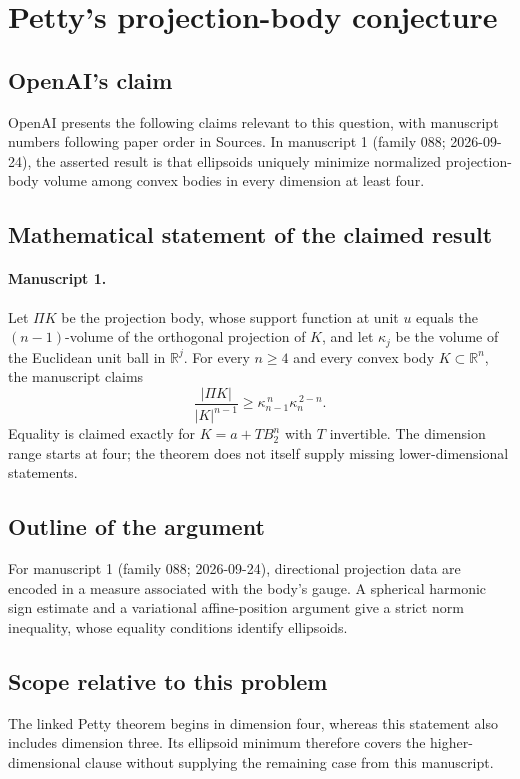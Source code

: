 \documentclass[11pt]{article}
\begin{document}
\section*{Petty's projection-body conjecture}

\subsection{OpenAI's claim}
OpenAI presents the following claims relevant to this question, with manuscript numbers following paper order in Sources. In manuscript 1 (family 088; 2026-09-24), the asserted result is that ellipsoids uniquely minimize normalized projection-body volume among convex bodies in every dimension at least four.

\subsection{Mathematical statement of the claimed result}
\paragraph{Manuscript 1.}
Let $\Pi K$ be the projection body, whose support function at unit $u$ equals the $(n-1)$-volume of the orthogonal projection of $K$, and let $\kappa_j$ be the volume of the Euclidean unit ball in $\mathbb R^j$. For every $n\ge4$ and every convex body $K\subset\mathbb R^n$, the manuscript claims
\[
 \frac{|\Pi K|}{|K|^{n-1}}\ge\kappa_{n-1}^{\,n}\kappa_n^{\,2-n}.
\]
Equality is claimed exactly for $K=a+TB_2^n$ with $T$ invertible. The dimension range starts at four; the theorem does not itself supply missing lower-dimensional statements.

\subsection{Outline of the argument}
For manuscript 1 (family 088; 2026-09-24), directional projection data are encoded in a measure associated with the body's gauge. A spherical harmonic sign estimate and a variational affine-position argument give a strict norm inequality, whose equality conditions identify ellipsoids.

\subsection{Scope relative to this problem}
The linked Petty theorem begins in dimension four, whereas this statement also includes dimension three. Its ellipsoid minimum therefore covers the higher-dimensional clause without supplying the remaining case from this manuscript.
\end{document}
